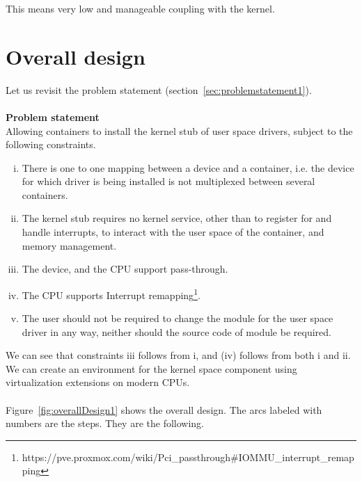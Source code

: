 \documentclass[twoside]{iitbreport}
\begin{document}
This means very low and manageable coupling with the kernel.

\section{Overall design}
Let us revisit the problem statement (section~\ref{sec:problemstatement1}).
\\\\
\textbf{Problem statement}\\
Allowing containers to install the kernel stub of user space drivers, subject to the following constraints.

\begin{enumerate}[(i)]
\item There is one to one mapping between a device and a container, i.e. the device for which driver is being installed is not multiplexed between several containers.
\item The kernel stub requires no kernel service, other than to register for and handle interrupts, to interact with the user space of the container, and memory management.
\item The device, and the CPU support pass-through. 
\item The CPU supports Interrupt remapping\footnote{https://pve.proxmox.com/wiki/Pci\_passthrough\#IOMMU\_interrupt\_remapping}.
\item The user should not be required to change the module for the user space driver in any way, neither should the source code of module be required.
\end{enumerate}

We can see that constraints iii follows from i, and (iv) follows from both i and ii. We can create an environment for the kernel space component using virtualization extensions on modern CPUs.
\\\\
Figure~\ref{fig:overallDesign1} shows the overall design. The arcs labeled with numbers are the steps. They are the following.
\end{document}
